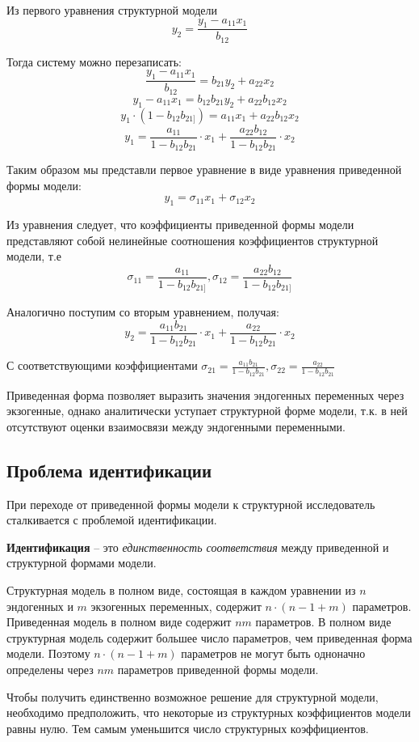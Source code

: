 \documentclass[aps,%
12pt,%
final,%
oneside,
onecolumn,%
musixtex, %
superscriptaddress,%
centertags]{article} %
\begin{document}
Из первого уравнения структурной модели
$$y_2 = \frac{y_1-a_{11}x_1}{b_{12}}$$

Тогда систему можно перезаписать:
$$ \frac{y_1-a_{11}x_1}{b_{12}} =  b_{21}y_2 + a_{22}x_2$$
$$y_1 - a_{11}x_1 = b_{12}b_{21}y_2 + a_{22}b_{12}x_2$$
$$y_1 \cdot (1-b_{12}b_{21]}) = a_{11}x_1 + a_{22}b_{12}x_2$$
$$y_1 = \frac{a_{11}}{1-b_{12}b_{21}}\cdot x_1 + \frac{ a_{22}b_{12}}{1-b_{12}b_{21}}\cdot x_2$$

Таким образом мы представли первое уравнение в виде уравнения приведенной формы модели:
$$y_1 = \sigma_{11}x_1 + \sigma_{12}x_2$$

Из уравнения следует, что коэффициенты приведенной формы модели представляют собой нелинейные соотношения коэффициентов структурной модели, т.е
$$\sigma_{11} =  \frac{a_{11}}{1-b_{12}b_{21]}}, \sigma_{12} = \frac{ a_{22}b_{12}}{1-b_{12}b_{21]}}$$

Аналогично поступим со вторым уравнением, получая:
$$y_2 = \frac{a_{11}b_{21}}{1-b_{12}b_{21}}\cdot x_1 + \frac{ a_{22}}{1-b_{12}b_{21}}\cdot x_2$$

С соответствующими коэффициентами $\sigma_{21} =  \frac{a_{11}b_{21}}{1-b_{12}b_{21}}, \sigma_{22} = \frac{ a_{22}}{1-b_{12}b_{21}}$

Приведенная форма позволяет выразить значения эндогенных переменных через экзогенные, однако аналитически уступает структурной форме модели, т.к. в ней отсутствуют оценки взаимосвязи между эндогенными переменными.

\subsection{Проблема идентификации}
При переходе от приведенной формы модели к структурной исследователь сталкивается с проблемой идентификации.

\textbf{Идентификация} – это \textit{единственность соответствия} между приведенной и структурной формами модели.

Структурная модель в полном виде, состоящая в каждом уравнении из $n$ эндогенных и $m$ экзогенных переменных, содержит $n\cdot(n-1+m)$ параметров. Приведенная модель в полном виде содержит $nm$ параметров. В полном виде структурная модель содержит большее число параметров, чем приведенная форма модели. Поэтому $n\cdot(n-1+m)$ параметров не могут быть одноначно определены через $nm$ параметров приведенной формы модели.

Чтобы получить единственно возможное решение для структурной модели, необходимо предположить, что некоторые из структурных коэффициентов модели равны нулю. Тем самым уменьшится число структурных коэффициентов.
\end{document}
